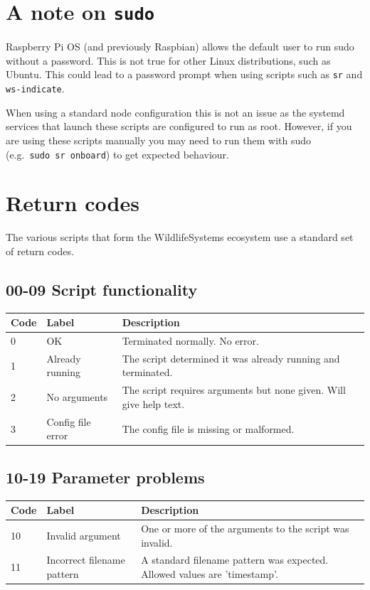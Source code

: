 \documentclass[
]{book}
\begin{document}
\appendix


\chapter{\texorpdfstring{A note on \texttt{sudo}}{A note on sudo}}\label{a-note-on-sudo-1}

Raspberry Pi OS (and previously Raspbian) allows the default user to run sudo without a password. This is not true for other Linux distributions, such as Ubuntu. This could lead to a password prompt when using scripts such as \texttt{sr} and \texttt{ws-indicate}.

When using a standard node configuration this is not an issue as the systemd services that launch these scripts are configured to run as root. However, if you are using these scripts manually you may need to run them with sudo (e.g.~\texttt{sudo\ sr\ onboard}) to get expected behaviour.

\chapter{Return codes}\label{return-codes}

The various scripts that form the WildlifeSystems ecosystem use a standard set of return codes.

\section{00-09 Script functionality}\label{script-functionality}

\begin{tabular}{l|l|l}
\hline
Code & Label & Description\\
\hline
0 & OK & Terminated normally. No error.\\
\hline
1 & Already running & The script determined it was already running and terminated.\\
\hline
2 & No arguments & The script requires arguments but none given. Will give help text.\\
\hline
3 & Config file error & The config file is missing or malformed.\\
\hline
\end{tabular}

\section{10-19 Parameter problems}\label{parameter-problems}

\begin{tabular}{l|l|l}
\hline
Code & Label & Description\\
\hline
10 & Invalid argument & One or more of the arguments to the script was invalid.\\
\hline
11 & Incorrect filename pattern & A standard filename pattern was expected. Allowed values are 'timestamp'.\\
\hline
\end{tabular}
\end{document}
